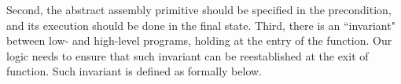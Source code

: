 Second, the abstract assembly primitive should be
specified in the precondition, and its execution
should be done in the final state.
Third, there is an ``invariant"
between low- and high-level programs, holding at the entry of
the function. Our logic needs to ensure that such invariant
can be reestablished at the exit of function.
% 
Such invariant is defined as \INV{} formally below. 
